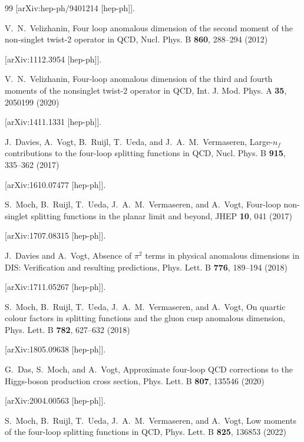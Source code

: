 \documentclass[
 twocolumn,
 superscriptaddress,
 preprintnumbers,
 nofootinbib,
 amsmath,amssymb,
 aps,
 prl
 ]{revtex4-2}
\begin{document}
\begin{thebibliography}{99}
[arXiv:hep-ph/9401214 [hep-ph]].



V.~N.~Velizhanin,
Four loop anomalous dimension of the second moment of the non-singlet twist-2 operator in QCD,
Nucl. Phys. B \textbf{860}, 288--294 (2012)

[arXiv:1112.3954 [hep-ph]].



V.~N.~Velizhanin,
Four-loop anomalous dimension of the third and fourth moments of the nonsinglet twist-2 operator in QCD,
Int. J. Mod. Phys. A \textbf{35}, 2050199 (2020)

[arXiv:1411.1331 [hep-ph]].



J.~Davies, A.~Vogt, B.~Ruijl, T.~Ueda, and J.~A.~M.~Vermaseren,
Large-$n_f$ contributions to the four-loop splitting functions in QCD,
Nucl. Phys. B \textbf{915}, 335--362 (2017)

[arXiv:1610.07477 [hep-ph]].



S.~Moch, B.~Ruijl, T.~Ueda, J.~A.~M.~Vermaseren, and A.~Vogt,
Four-loop non-singlet splitting functions in the planar limit and beyond,
JHEP \textbf{10}, 041 (2017)

[arXiv:1707.08315 [hep-ph]].



J.~Davies and A.~Vogt,
Absence of $\pi^2$ terms in physical anomalous dimensions in DIS: Verification and resulting predictions,
Phys. Lett. B \textbf{776}, 189--194 (2018)

[arXiv:1711.05267 [hep-ph]].



S.~Moch, B.~Ruijl, T.~Ueda, J.~A.~M.~Vermaseren, and A.~Vogt,
On quartic colour factors in splitting functions and the gluon cusp anomalous dimension,
Phys. Lett. B \textbf{782}, 627--632 (2018)

[arXiv:1805.09638 [hep-ph]].



G.~Das, S.~Moch, and A.~Vogt,
Approximate four-loop QCD corrections to the Higgs-boson production cross section,
Phys. Lett. B \textbf{807}, 135546 (2020)

[arXiv:2004.00563 [hep-ph]].



S.~Moch, B.~Ruijl, T.~Ueda, J.~A.~M.~Vermaseren, and A.~Vogt,
Low moments of the four-loop splitting functions in QCD,
Phys. Lett. B \textbf{825}, 136853 (2022)


\end{thebibliography}
\end{document}

